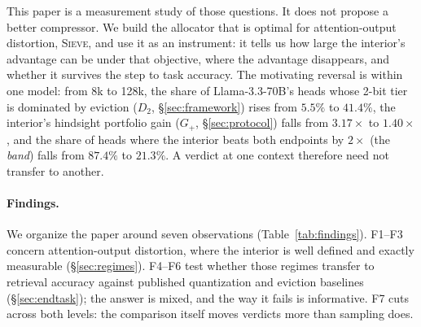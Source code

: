 \documentclass{article}
\newcommand{\sieve}{\textsc{Sieve}}
\newcommand{\gplus}{G_{+}}
\theoremstyle{definition}
\begin{document}
This paper is a measurement study of those questions.  It does not propose a better compressor.  We build the allocator that is optimal for attention-output distortion, \sieve{}, and use it as an instrument: it tells us how large the interior's advantage can be under that objective, where the advantage disappears, and whether it survives the step to task accuracy.  The motivating reversal is within one model: from 8k to 128k, the share of Llama-3.3-70B's heads whose 2-bit tier is dominated by eviction ($D_2$, \S\ref{sec:framework}) rises from $5.5\%$ to $41.4\%$, the interior's hindsight portfolio gain ($\gplus$, \S\ref{sec:protocol}) falls from $3.17\times$ to $1.40\times$, and the share of heads where the interior beats both endpoints by $2\times$ (the \emph{band}) falls from $87.4\%$ to $21.3\%$.  A verdict at one context therefore need not transfer to another.

\paragraph{Findings.}  We organize the paper around seven observations (Table~\ref{tab:findings}).  F1--F3 concern attention-output distortion, where the interior is well defined and exactly measurable (\S\ref{sec:regimes}).  F4--F6 test whether those regimes transfer to retrieval accuracy against published quantization and eviction baselines (\S\ref{sec:endtask}); the answer is mixed, and the way it fails is informative.  F7 cuts across both levels: the comparison itself moves verdicts more than sampling does.
\end{document}
